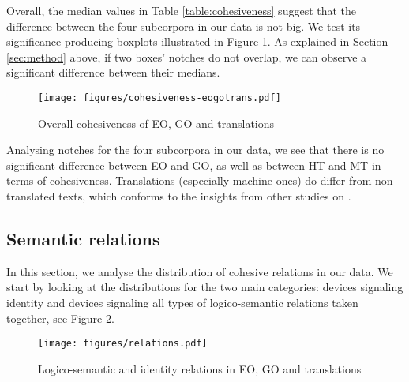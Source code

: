 \documentclass[output=paper]{langsci/langscibook.cls}
\begin{document}
Overall, the median values in Table \ref{table:cohesiveness} suggest that the difference between the four subcorpora in our data is not big. We test its significance producing boxplots illustrated in Figure \ref{fig:eogo}. As explained in Section \ref{sec:method} above, if two boxes’ notches do not overlap, we can observe a significant difference between their medians. 

\begin{figure}

\texttt{[image: figures/cohesiveness-eogotrans.pdf]}
\caption{Overall cohesiveness of EO, GO and translations}
\label{fig:eogo}
\end{figure}

Analysing notches for the four subcorpora in our data, we see that there is no significant difference between EO and GO, as well as between HT and MT in terms of cohesiveness. Translations (especially machine ones) do differ from non-translated texts, which conforms to the insights from other studies on .  


%


\subsection{Semantic relations}\label{section:relations}

In this section, we analyse the distribution of cohesive relations in our data. We start by looking at the distributions for the two main categories: devices signaling identity and devices signaling all types of logico-semantic relations taken together, see Figure \ref{fig:relations}. %

\begin{figure}

\texttt{[image: figures/relations.pdf]}
\caption{Logico-semantic and identity relations in EO, GO and translations}
\label{fig:relations}
\end{figure}
\end{document}
